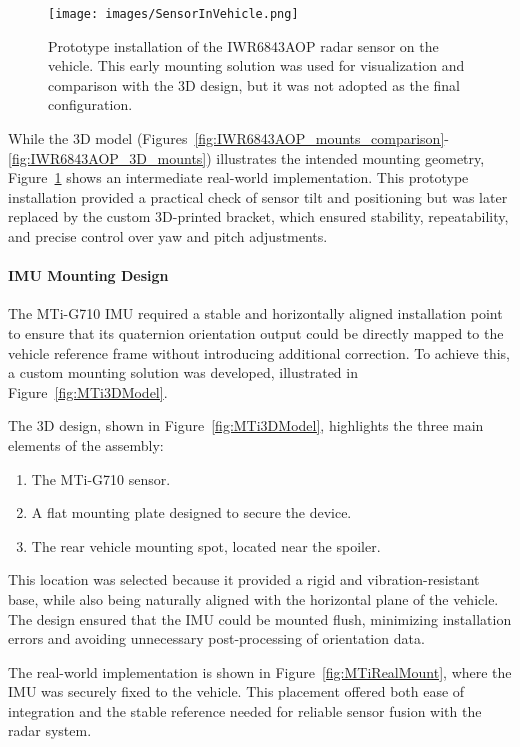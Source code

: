 \begin{figure}[!htbp]
    \centering
    \texttt{[image: images/SensorInVehicle.png]}
    \caption{Prototype installation of the IWR6843AOP radar sensor on the vehicle. 
    This early mounting solution was used for visualization and comparison with the 3D design, but it was not adopted as the final configuration.}
    \label{fig:SensorInVehicle}
\end{figure}

While the 3D model (Figures~\ref{fig:IWR6843AOP_mounts_comparison}-\ref{fig:IWR6843AOP_3D_mounts}) illustrates the intended mounting geometry, Figure~\ref{fig:SensorInVehicle} shows an intermediate real-world implementation.
This prototype installation provided a practical check of sensor tilt and positioning but was later replaced by the custom 3D-printed bracket, which ensured stability, repeatability, and precise control over yaw and pitch adjustments.


\paragraph{IMU Mounting Design}
The MTi-G710 IMU required a stable and horizontally aligned installation point to ensure that its quaternion orientation output could be directly mapped to the vehicle reference frame without introducing additional correction.  
To achieve this, a custom mounting solution was developed, illustrated in Figure~\ref{fig:MTi3DModel}.  

The 3D design, shown in Figure~\ref{fig:MTi3DModel}, highlights the three main elements of the assembly:  
\begin{enumerate}
    \item The MTi-G710 sensor.  
    \item A flat mounting plate designed to secure the device.  
    \item The rear vehicle mounting spot, located near the spoiler.  
\end{enumerate}

This location was selected because it provided a rigid and vibration-resistant base, while also being naturally aligned with the horizontal plane of the vehicle.  
The design ensured that the IMU could be mounted flush, minimizing installation errors and avoiding unnecessary post-processing of orientation data.  

The real-world implementation is shown in Figure~\ref{fig:MTiRealMount}, where the IMU was securely fixed to the vehicle.  
This placement offered both ease of integration and the stable reference needed for reliable sensor fusion with the radar system.  


